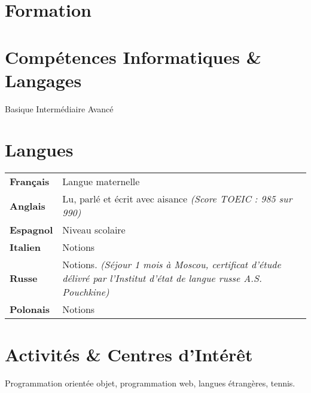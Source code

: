 \documentclass[10pt, a4paper]{article}
\begin{document}
\section{Formation}
\begin{education}
\end{education}
\section{Compétences Informatiques \& Langages}
\vspace{-0.5em}
\begin{skillslisting}
	\skills{\threeskill}{\python}
	\skills{\twoskill}{\bootstrap}
	\skills{\threeskill}{\html}
	\skills{\threeskill}{\sass}
	\skills{\threeskill}{\js}
	\skills{\threeskill}{\jquery}
	\skills{\twoskill}{\react}
	\skills{\oneskill}{\angular}
	\skills{\threeskill}{\sql}
	\skills{\twoskill}{\git}
	\skills{\twoskill}{\patterns}
	\skills{\oneskill}{\visb}
	\skills{\twoskill}{\LaTeX}
	\skills{\twoskill}{\matlab}
\end{skillslisting}
\vspace{-0.5em}
\begin{footnotesize}
	\oneskill Basique \hfill
	\twoskill Intermédiaire \hfill
	\threeskill Avancé
\end{footnotesize}
\section{Langues}
\begin{tabu} to 
	\textbf{Français} & Langue maternelle\\
	\textbf{Anglais} & Lu, parlé et écrit avec aisance \em (Score TOEIC : 985 sur 990)\\
	\textbf{Espagnol} & Niveau scolaire\\
	\textbf{Italien} & Notions\\
	\textbf{Russe} & Notions. \em (Séjour 1 mois à Moscou, certificat d'étude délivré par l'Institut d'état de langue russe A.S. Pouchkine)\\
	\textbf{Polonais} & Notions
\end{tabu}
\vspace{0.1cm}


\section{Activités \& Centres d'Intérêt}
Programmation orientée objet, programmation web, langues étrangères, tennis.
\end{document}
